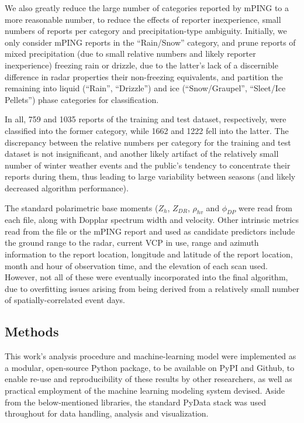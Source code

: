 \documentclass{agujournal}
\begin{document}
We also greatly reduce the large number of categories reported by mPING to a more reasonable number, to reduce the effects of reporter inexperience, small numbers of reports per category and precipitation-type ambiguity. Initially, we only consider mPING reports in the ``Rain/Snow'' category, and prune reports of mixed precipitation (due to small relative numbers and likely reporter inexperience) freezing rain or drizzle, due to the latter's lack of a discernible difference in radar properties their non-freezing equivalents, and partition the remaining into liquid (``Rain'', ``Drizzle'') and ice (``Snow/Graupel'', ``Sleet/Ice Pellets'') phase categories for classification.

In all, 759 and 1035 reports of the training and test dataset, respectively, were classified into the former category, while 1662 and 1222 fell into the latter. The discrepancy between the relative numbers per category for the training and test dataset is not insignificant, and another likely artifact of the relatively small number of winter weather events and the public's tendency to concentrate their reports during them, thus leading to large variability between seasons (and likely decreased algorithm performance).

The standard polarimetric base moments ($Z_h$, $Z_{DR}$, $\rho_{hv}$ and $\phi_{DP}$ were read from each file, along with Dopplar spectrum width and velocity. Other intrinsic metrics read from the file or the mPING report and used as candidate predictors include the ground range to the radar, current VCP in use, range and azimuth information to the report location, longitude and latitude of the report location, month and hour of observation time, and the elevation of each scan used. However, not all of these were eventually incorporated into the final algorithm, due to overfitting issues arising from being derived from a relatively small number of spatially-correlated event days.


\subsection{Methods}

This work's analysis procedure and machine-learning model were implemented as a modular, open-source Python package, to be available on PyPI and Github, to enable re-use and reproducibility of these results by other researchers, as well as practical employment of the machine learning modeling system devised. Aside from the below-mentioned libraries, the standard PyData stack was used throughout for data handling, analysis and visualization.
\end{document}
